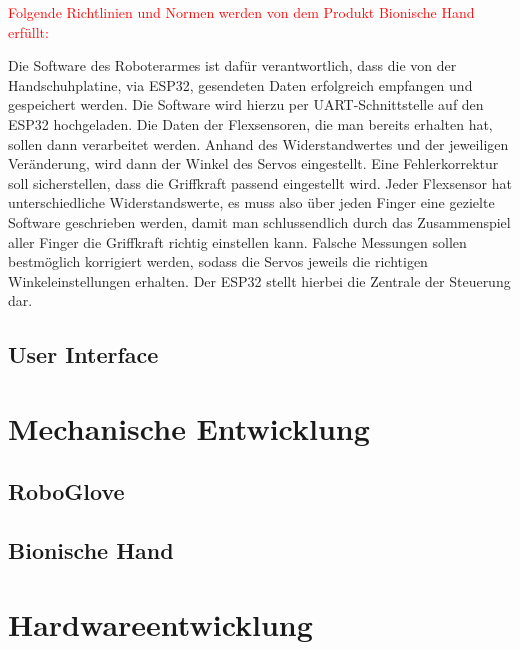 \documentclass[11pt]{article}
\begin{document}
\textcolor{red}{Folgende Richtlinien und Normen werden von dem Produkt Bionische Hand erfüllt:}

Die Software des Roboterarmes ist dafür verantwortlich, dass die von der Handschuhplatine, via ESP32, gesendeten Daten 
erfolgreich empfangen und gespeichert werden. Die Software wird hierzu per UART-Schnittstelle auf den ESP32 hochgeladen. 
Die Daten der Flexsensoren, die man bereits erhalten hat, sollen dann verarbeitet werden. Anhand des Widerstandwertes und 
der jeweiligen Veränderung, wird dann der Winkel des Servos eingestellt. Eine Fehlerkorrektur soll sicherstellen, dass die 
Griffkraft passend eingestellt wird. Jeder Flexsensor hat unterschiedliche Widerstandswerte, es muss also über jeden Finger 
eine gezielte Software geschrieben werden, damit man schlussendlich durch das Zusammenspiel aller Finger die Griffkraft 
richtig einstellen kann. Falsche Messungen sollen bestmöglich korrigiert werden, sodass die Servos jeweils die richtigen 
Winkeleinstellungen erhalten. Der ESP32 stellt hierbei die Zentrale der Steuerung dar.

\subsection{User Interface}


\section{Mechanische Entwicklung}

\subsection{RoboGlove}

\subsection{Bionische Hand}


\section{Hardwareentwicklung}
\end{document}
